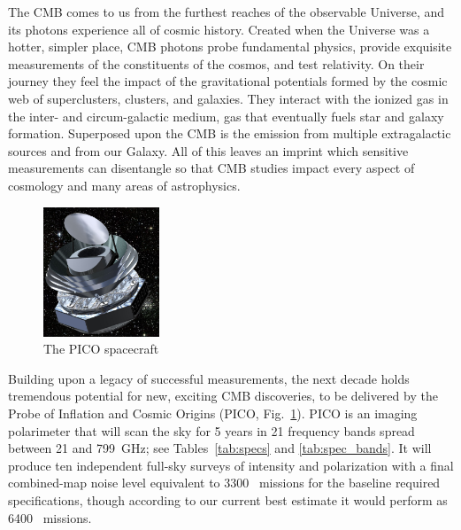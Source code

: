 \documentclass[PICOReport.tex]{subfiles}
\begin{document}

The \ac{CMB} comes to us from the furthest reaches of the observable Universe, and its photons experience all of cosmic history.  Created when the Universe was a hotter, simpler place, CMB photons probe fundamental physics, provide exquisite measurements of the constituents of the cosmos, and test relativity.  On their journey they feel the impact of the gravitational potentials formed by the cosmic web of superclusters, clusters, and galaxies.  They interact with the ionized gas in the inter- and circum-galactic medium, gas that eventually fuels star and galaxy formation.  Superposed upon the CMB is the emission from multiple extragalactic sources and from our Galaxy.  All of this leaves an imprint which sensitive measurements can disentangle so that CMB studies impact every aspect of cosmology and many areas of astrophysics.

\begin{figure}  %
\vspace{-5pt} %
\includegraphics[width=0.31\textwidth]{images/PICO_Image.jpg}
\vspace{-0.25in}
\caption{\captiontext The PICO spacecraft 
\label{fig:pico_rendered} }
\end{figure}

Building upon a legacy of successful measurements, the next decade holds tremendous potential for new, exciting \ac{CMB} discoveries, to be delivered by the Probe of Inflation and Cosmic Origins (PICO, Fig.~\ref{fig:pico_rendered}). PICO is an imaging polarimeter that will scan the sky for 5 years in 21 frequency bands spread between 21 and 799~GHz; see Tables~\ref{tab:specs} and \ref{tab:spec_bands}. It will produce ten independent full-sky surveys of intensity and polarization with a final combined-map noise level equivalent to 3300 \planck\ missions for the baseline required specifications, though according to our current best estimate it would perform as 6400 \planck\ missions.  
\end{document}
